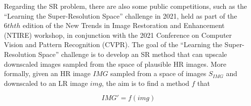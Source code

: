 \documentclass{article}
\begin{document}
Regarding the SR problem, there are also some public competitions, such as the ``Learning the Super-Resolution Space'' challenge in 2021, held as part of the $6th{th}$ edition of the New Trends in Image Restoration and Enhancement (NTIRE) workshop, in conjunction with the 2021 Conference on Computer Vision and Pattern Recognition (CVPR). The goal of the ``Learning the Super-Resolution Space'' challenge is to develop an SR method that can upscale downscaled images sampled from the space of plausible HR images. More formally, given an HR image $IMG$ sampled from a space of images $S_{IMG}$ and downscaled to an LR image $img$, the aim is to find a method $f$ that

\begin{displaymath}
    IMG' = f(img)
\end{displaymath}
\end{document}
